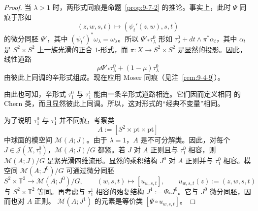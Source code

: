 \begin{proof}
当 $\lambda>1$ 时，两形式同痕是命题~\ref{prop:9-7-2} 的推论。事实上，此时 $\Psi$
同痕于形如
\[
  (z,w,s,t)\longmapsto(\psi_t'(z,w),s,t)
\]
的微分同胚 $\Psi'$，其中 $(\psi_t')^*\omega_\lambda=\omega_\lambda$。所以
$\Psi'_*\tau_\lambda^0$ 形如
$\tau_\lambda^0+dt\wedge\pi^*\alpha_t$，其中 $\alpha_t$ 是
$S^2\times S^2$ 上一族光滑的正合 $1$-形式，而
$\pi:X\to S^2\times S^2$ 是显然的投影。因此，线性道路
\[
  \mu\Psi'_*\tau_\lambda^0+(1-\mu)\tau_\lambda^0
\]
由彼此上同调的辛形式组成。现在应用 Moser 同痕（见注~\ref{rem:9-4-9}）。

由此也可知，辛形式 $\tau_1^0$ 与 $\tau_1^1$ 能由一条辛形式道路相连。它们因而定义相同
的 Chern 类，而且显然彼此上同调。所以，这对形式的“经典不变量”相同。

为了说明 $\tau_1^0$ 与 $\tau_1^1$ 并不同痕，考察类
\[
  A:=[S^2\times\mathrm{pt}\times\mathrm{pt}]
\]
中球面的模空间 $\mathcal M(A;J)$。由于 $\lambda=1$，$A$ 是不可分解类。因此，对每个
$J\in\mathcal J(X,\tau_1^0)$，$\mathcal M(A;J)/G$ 都紧。若 $J$ 对 $A$ 正则且与
$\tau_1^0$ 相容，则 $\mathcal M(A;J)/G$ 是紧光滑四维流形。显然的乘积结构 $J^0$
对 $A$ 正则并与 $\tau_1^0$ 相容。模空间 $\mathcal M(A;J^0)/G$ 可通过微分同胚
\[
  S^2\times\mathbb T^2\longrightarrow\mathcal M(A;J^0)/G,
  \qquad (w,s,t)\longmapsto[u_{w,s,t}],
  \qquad u_{w,s,t}(z):=(z,w,s,t)
\]
与 $S^2\times\mathbb T^2$ 等同。再考虑与 $\tau_1^1$ 相容的殆复结构
$J^1:=\Psi_*J^0$。它与 $J^0$ 微分同胚，因而也对 $A$ 正则。
$\mathcal M(A;J^1)$ 的元素是等价类 $[\Psi\circ u_{w,s,t}]$。


\end{proof}
